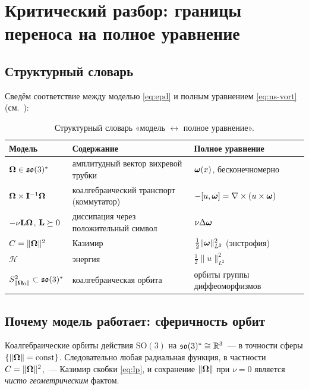 \needspace{0.25\textheight}
\section{Критический разбор: границы переноса на полное уравнение}\label{sec:critique}

\subsection{Структурный словарь}

Сведём соответствие между моделью \eqref{eq:epd} и полным уравнением
\eqref{eq:ns-vort} (см.~\cite{arnoldkhesin,marsdenratiu}):

\begin{table}[htbp]
\centering
\small
\caption{Структурный словарь «модель $\leftrightarrow$ полное уравнение».}
\label{tab:dictionary}
\begin{tabularx}{\textwidth}{@{}l X l@{}}
\toprule
Модель & Содержание & Полное уравнение \\
\midrule
$\boldsymbol{\Omega} \in \mathfrak{so}(3)^{*}$ & амплитудный вектор вихревой трубки &
  $\boldsymbol{\omega}(x)$, бесконечномерно \\
$\boldsymbol{\Omega}\times\mathbf{I}^{-1}\boldsymbol{\Omega}$ & коалгебраический транспорт (коммутатор) &
  $-[u,\boldsymbol{\omega}] = \nabla\times(u\times\boldsymbol{\omega})$ \\
$-\nu\mathbf{L}\boldsymbol{\Omega}$, $\mathbf{L}\succeq0$ & диссипация через положительный символ &
  $\nu\Delta\boldsymbol{\omega}$ \\
$C = \|\boldsymbol{\Omega}\|^2$ & Казимир & $\tfrac12\|\boldsymbol{\omega}\|_{L^2}^2$ (энстрофия) \\
$\mathcal H$ & энергия & $\tfrac12\|u\|_{L^2}^2$ \\
$S^2_{\|\boldsymbol{\Omega}_0\|} \subset \mathfrak{so}(3)^{*}$ & коалгебраическая орбита &
  орбиты группы диффеоморфизмов \\
\bottomrule
\end{tabularx}
\end{table}

\subsection{Почему модель работает: сферичность орбит}

\begin{proposition}[орбиты $\so^{*}$]\label{prop:orbits}
Коалгебраические орбиты действия $\mathrm{SO}(3)$ на $\mathfrak{so}(3)^{*}
\cong \mathbb{R}^3$~--- в точности сферы $\{\|\boldsymbol{\Omega}\| = \mathrm{const}\}$.
Следовательно любая радиальная функция, в частности $C = \|\boldsymbol{\Omega}\|^2$,~---
Казимир скобки \eqref{eq:lp}, и сохранение $\|\boldsymbol{\Omega}\|$ при $\nu=0$
является \emph{чисто геометрическим} фактом.
\end{proposition}

